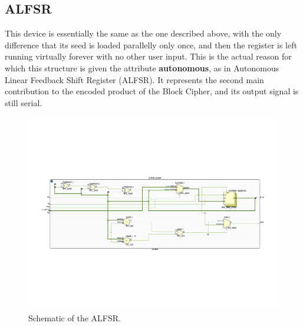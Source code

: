 \subsection{ALFSR}
This device is essentially the same as the one described above, with the only difference that its seed is loaded parallelly only once, and then the register is left running virtually forever with no other user input.
This is the actual reason for which this structure is given the attribute \textbf{autonomous}, as in Autonomous Linear Feedback Shift Register (ALFSR).
It represents the second main contribution to the encoded product of the Block Cipher, and its output signal is still serial.
\begin{figure}[!ht]
\vspace{0.5cm}
\includegraphics[width=\textwidth]{images/alfsr.png}
\caption{Schematic of the ALFSR.}
\end{figure}
